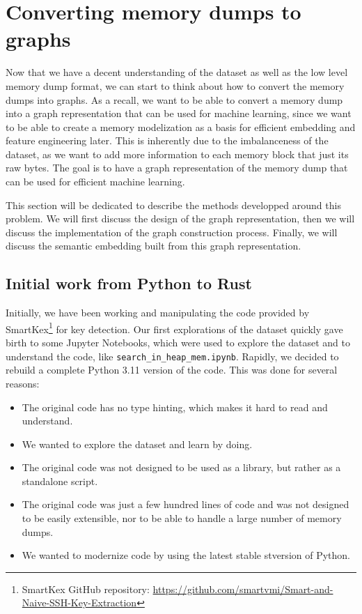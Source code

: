 \section{Converting memory dumps to graphs}\label{chap:mem_2_graph}
Now that we have a decent understanding of the dataset as well as the low level memory dump format, we can start to think about how to convert the memory dumps into graphs. As a recall, we want to be able to convert a memory dump into a graph representation that can be used for machine learning, since we want to be able to create a memory modelization as a basis for efficient embedding and feature engineering later. This is inherently due to the imbalanceness of the dataset, as we want to add more information to each memory block that just its raw bytes. The goal is to have a graph representation of the memory dump that can be used for efficient machine learning.

This section will be dedicated to describe the methods developped around this problem. We will first discuss the design of the graph representation, then we will discuss the implementation of the graph construction process. Finally, we will discuss the semantic embedding built from this graph representation.

\subsection{Initial work from Python to Rust}

Initially, we have been working and manipulating the code provided by SmartKex\footnote{SmartKex GitHub repository: \url{https://github.com/smartvmi/Smart-and-Naive-SSH-Key-Extraction}} for key detection. Our first explorations of the dataset quickly gave birth to some Jupyter Notebooks, which were used to explore the dataset and to understand the code, like \texttt{search\_in\_heap\_mem.ipynb}. Rapidly, we decided to rebuild a complete Python 3.11 version of the code. This was done for several reasons:

\begin{itemize}
    \item The original code has no type hinting, which makes it hard to read and understand.
    \item We wanted to explore the dataset and learn by doing.
    \item The original code was not designed to be used as a library, but rather as a standalone script.
    \item The original code was just a few hundred lines of code and was not designed to be easily extensible, nor to be able to handle a large number of memory dumps.
    \item We wanted to modernize code by using the latest stable stversion of Python.
\end{itemize}

